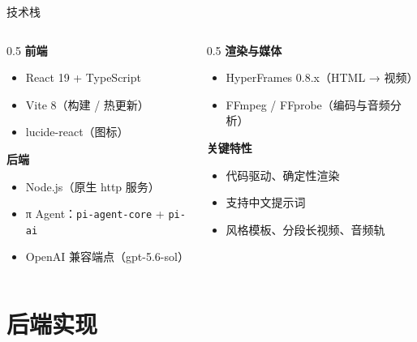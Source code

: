 \documentclass[aspectratio=169,11pt]{beamer}
\begin{document}
\begin{frame}{技术栈}
  \begin{columns}[T]
    \begin{column}{0.5\textwidth}
      \textbf{前端}
      \begin{itemize}
        \item React 19 + TypeScript
        \item Vite 8（构建 / 热更新）
        \item lucide-react（图标）
      \end{itemize}
      \vspace{0.8em}
      \textbf{后端}
      \begin{itemize}
        \item Node.js（原生 http 服务）
        \item π Agent：\texttt{pi-agent-core} + \texttt{pi-ai}
        \item OpenAI 兼容端点（gpt-5.6-sol）
      \end{itemize}
    \end{column}
    \begin{column}{0.5\textwidth}
      \textbf{渲染与媒体}
      \begin{itemize}
        \item HyperFrames 0.8.x（HTML → 视频）
        \item FFmpeg / FFprobe（编码与音频分析）
      \end{itemize}
      \vspace{0.8em}
      \textbf{关键特性}
      \begin{itemize}
        \item 代码驱动、确定性渲染
        \item 支持中文提示词
        \item 风格模板、分段长视频、音频轨
      \end{itemize}
    \end{column}
  \end{columns}
\end{frame}

\section{后端实现}
\end{document}
